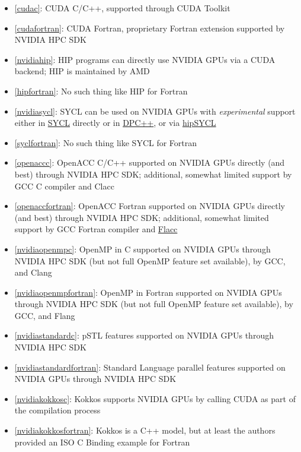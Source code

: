 \begin{itemize}
    \tightlist%
    \item \ref{cudac}: CUDA C/C++, supported through CUDA Toolkit
    \item \ref{cudafortran}: CUDA Fortran, proprietary Fortran extension supported by NVIDIA HPC SDK
    \item \ref{nvidiahip}: HIP programs can directly use NVIDIA GPUs via a CUDA backend; HIP is maintained by AMD
    \item \ref{hipfortran}: No such thing like HIP for Fortran
    \item \ref{nvidiasycl}: SYCL can be used on NVIDIA GPUs with \emph{experimental} support either in 
    \href{https://github.com/codeplaysoftware/sycl-for-cuda/blob/cuda/sycl/doc/GetStartedWithSYCLCompiler.md\#build-sycl-toolchain-with-support-for-nvidia-cuda}{SYCL} directly or in 
    \href{https://github.com/intel/llvm/blob/sycl/sycl/doc/GetStartedGuide.md\#build-dpc-toolchain-with-support-for-nvidia-cuda}{DPC++}, 
    or via \href{https://github.com/illuhad/hipSYCL}{hipSYCL}
    \item \ref{syclfortran}: No such thing like SYCL for Fortran
    \item \ref{openaccc}: OpenACC C/C++ supported on NVIDIA GPUs directly (and best) through NVIDIA HPC SDK; additional, somewhat limited support by GCC C compiler and Clacc
    \item \ref{openaccfortran}: OpenACC Fortran supported on NVIDIA GPUs directly (and best) through NVIDIA HPC SDK; additional, somewhat limited support by GCC Fortran compiler and \href{https://ieeexplore.ieee.org/document/9651310}{Flacc}
    \item \ref{nvidiaopenmpc}: OpenMP in C supported on NVIDIA GPUs through NVIDIA HPC SDK (but not full OpenMP feature set available), by GCC, and Clang
    \item \ref{nvidiaopenmpfortran}: OpenMP in Fortran supported on NVIDIA GPUs through NVIDIA HPC SDK (but not full OpenMP feature set available), by GCC, and Flang
    \item \ref{nvidiastandardc}: pSTL features supported on NVIDIA GPUs through NVIDIA HPC SDK
    \item \ref{nvidiastandardfortran}: Standard Language parallel features supported on NVIDIA GPUs through NVIDIA HPC SDK
    \item \ref{nvidiakokkosc}: Kokkos supports NVIDIA GPUs by calling CUDA as part of the compilation process
    \item \ref{nvidiakokkosfortran}: Kokkos is a C++ model, but at least the authors provided an ISO C Binding example for Fortran

\end{itemize}
